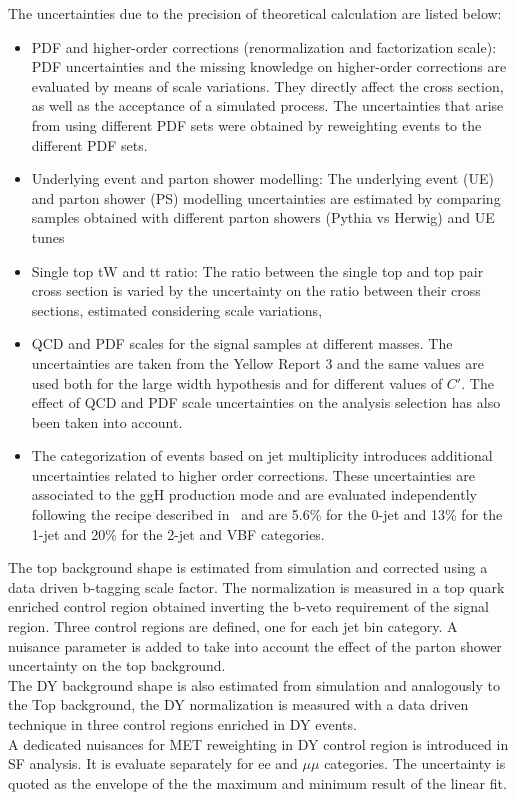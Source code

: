 The uncertainties due to the precision of theoretical calculation are listed below: 

\begin{itemize}
\item PDF and higher-order corrections (renormalization and factorization scale): PDF
uncertainties and the missing knowledge on higher-order corrections are evaluated by
means of scale variations. They directly affect the cross section, as well as the acceptance
of a simulated process. The uncertainties that arise from using different PDF sets
were obtained by reweighting events to the different PDF sets.

\item Underlying event and parton shower modelling: The underlying event (UE) and
parton shower (PS) modelling uncertainties are estimated by comparing samples
obtained with different parton showers (Pythia vs Herwig) and UE tunes

\item Single top tW and tt ratio: The ratio between the single top and top pair cross section
is varied by the uncertainty on the ratio between their cross sections, estimated considering scale variations,

\item QCD and PDF scales for the signal samples at different masses. The uncertainties are taken from the Yellow Report 3 and the same values are used both for the large width hypothesis and for different values of $C'$. The effect of QCD and PDF scale uncertainties on the analysis selection has also been taken into account.

\item The categorization of events based on jet multiplicity introduces additional uncertainties related to higher order corrections. These uncertainties are associated to the ggH production mode and are evaluated independently following the recipe described in~\cite{Boughezal:2013oha} and are 5.6\% for the 0-jet and  13\% for the 1-jet and 20\% for the 2-jet and VBF categories.




\end{itemize}



The top background shape is estimated from simulation and corrected using a data driven b-tagging scale factor. The normalization is measured in a top quark enriched control region obtained inverting the b-veto requirement of the signal region. Three control regions are defined, one for each jet bin category. 
A nuisance parameter is added to take into account the effect of the parton shower uncertainty on the top background. \\
The DY background shape is also estimated from simulation and analogously to the Top background, the DY normalization is measured with a data driven technique in three control regions enriched in DY events.\\
A dedicated nuisances for MET reweighting in DY control region is introduced in SF analysis. It is evaluate separately for ee and $\mu \mu$ categories. 
The uncertainty is quoted as the envelope of the the maximum and minimum result of the linear fit.

